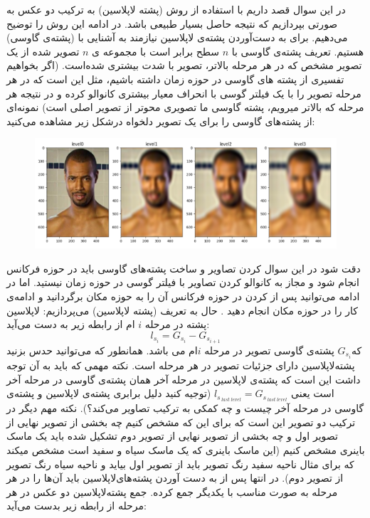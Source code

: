 \documentclass[a4paper]{article}
\begin{document}
در این سوال قصد داریم با استفاده از روش
(پشته لاپلاسین) به ترکیب دو عکس به صورتی بپردازیم که نتیجه حاصل بسیار طبیعی باشد. در ادامه این روش  را توضیح می‌دهیم. برای به دست‌آوردن پشته‌ی ‌لاپلاسین نیازمند به آشنایی با
(پشته‌ی گاوسی) هستیم. 
تعریف پشته‌ی گاوسی با $ n $ سطح
برابر است با مجموعه ی $ n $ تصویر
 شده از یک تصویر مشخص که در هر مرحله بالاتر، تصویر با شدت بیشتری 
  شده‌است. (اگر بخواهیم تفسیری از پشته های گاوسی در حوزه زمان داشته باشیم، مثل این است که در هر مرحله تصویر را با یک فیلتر گوسی با انحراف معیار بیشتری کانوالو کرده و در نتیجه هر مرحله که بالاتر میرویم، پشته گاوسی ما تصویری محو‌تر از تصویر اصلی است) نمونه‌ای از پشته‌های گاوسی را برای یک تصویر دلخواه در‌شکل زیر مشاهده می‌کنید:
\begin{figure}[H]
	\centering
	\includegraphics[width=0.6 \linewidth]{images/Picture1.png}
\end{figure}
دقت شود در این سوال
کردن تصاویر و ساخت پشته‌های گاوسی باید در حوزه فرکانس انجام شود و مجاز به کانوالو کردن تصاویر با فیلتر گوسی در حوزه زمان نیستید. اما در ادامه می‌توانید پس از
کردن در حوزه فرکانس آن را به حوزه مکان برگردانید و ادامه‌ی کار را در حوزه مکان انجام دهید .
حال به تعریف
(پشته لاپلاسین) می‌پردازیم: لاپلاسین پشته در مرحله $ i $ ام از رابطه زیر به دست می‌آید: 
\begin{equation*}
	l_{s_i}=G_{s_i}-G_{s_{i+1}}
\end{equation*}
که$ G_{s_i}$ پشته‌ی ‌گاوسی تصویر در مرحله $ i $ام می باشد. همانطور که می‌توانید حدس بزنید پشته‌لاپلاسین دارای جزئیات تصویر در هر مرحله است. نکته مهمی که باید به آن توجه داشت این است که پشته‌ی ‌لاپلاسین در مرحله آخر همان پشته‌ی ‌گاوسی در مرحله آخر است یعنی
 $l_{s_{\ last\ level}}=G_{s_{\ last\ level}}$ 
 (توجیه کنید دلیل برابری پشته‌ی ‌لاپلاسین و پشته‌ی ‌گاوسی در مرحله آخر چیست و چه کمکی به ترکیب تصاویر می‌کند؟).
نکته مهم دیگر در ترکیب دو تصویر این است که برای این که مشخص کنیم چه بخشی از تصویر نهایی از تصویر اول و چه بخشی از تصویر نهایی از تصویر دوم تشکیل شده باید یک ماسک باینری
 مشخص کنیم (این ماسک باینری که یک ماسک سیاه و سفید است مشخص میکند که برای مثال ناحیه سفید رنگ تصویر باید از تصویر اول بیاید و ناحیه سیاه رنگ تصویر از تصویر دوم). در انتها پس از به دست آوردن پشته‌های‌لاپلاسین باید آن‌ها را در هر مرحله به صورت مناسب با یکدیگر جمع کرده. جمع پشته‌لاپلاسین دو عکس در هر مرحله از رابطه زیر بدست می‌آید‌: 
\end{document}
